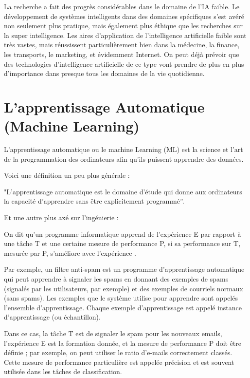 La recherche a fait des progrès considérables dans le domaine de l’IA faible. Le développement de systèmes intelligents dans des domaines spécifiques s’est avéré non seulement plus pratique, mais également plus éthique que les recherches sur la super intelligence. Les aires d’application de l’intelligence artificielle faible sont très vastes, mais réussissent particulièrement bien dans la médecine, la finance, les transports, le marketing, et évidemment Internet. On peut déjà prévoir que des technologies d’intelligence artificielle de ce type vont prendre de plus en plus d’importance dans presque tous les domaines de la vie quotidienne.

\section{L’apprentissage Automatique (Machine Learning)}
L'apprentissage automatique ou le machine Learning (ML) est la science et l'art de la programmation des ordinateurs afin qu'ils puissent apprendre des données.

Voici une définition un peu plus générale :

"L'apprentissage automatique est le domaine d'étude qui donne aux ordinateurs la capacité d'apprendre sans être explicitement programmé”\cite{samuelStudiesMachineLearning1988}.

Et une autre plus axé sur l'ingénierie :

On dit qu'un programme informatique apprend de l'expérience E par rapport à une tâche T et une certaine mesure de performance P, si sa performance sur T, mesurée par P, s'améliore avec l'expérience \cite{strachanWorldwideVariationsPrevalence1997}.

Par exemple, un filtre anti-spam est un programme d'apprentissage automatique qui peut apprendre à signaler les spams en donnant des exemples de spams (signalés par les utilisateurs, par exemple) et des exemples de courriels normaux (sans spams). Les exemples que le système utilise pour apprendre sont appelés l'ensemble d'apprentissage. Chaque exemple d'apprentissage est appelé instance d'apprentissage (ou échantillon).

Dans ce cas, la tâche T est de signaler le spam pour les nouveaux emails, l'expérience E est la formation donnée, et la mesure de performance P doit être définie ; par exemple, on peut utiliser le ratio d'e-mails correctement classés. Cette mesure de performance particulière est appelée précision et est souvent utilisée dans les tâches de classification.
\newpage
